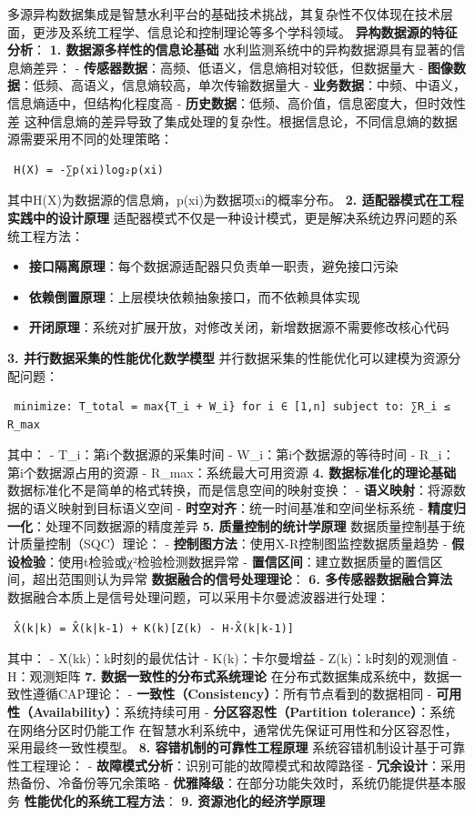 多源异构数据集成是智慧水利平台的基础技术挑战，其复杂性不仅体现在技术层面，更涉及系统工程学、信息论和控制理论等多个学科领域。 \textbf{异构数据源的特征分析}： \textbf{1. 数据源多样性的信息论基础} 水利监测系统中的异构数据源具有显著的信息熵差异： - \textbf{传感器数据}：高频、低语义，信息熵相对较低，但数据量大 - \textbf{图像数据}：低频、高语义，信息熵较高，单次传输数据量大 - \textbf{业务数据}：中频、中语义，信息熵适中，但结构化程度高 - \textbf{历史数据}：低频、高价值，信息密度大，但时效性差 这种信息熵的差异导致了集成处理的复杂性。根据信息论，不同信息熵的数据源需要采用不同的处理策略： \begin{verbatim} H(X) = -∑p(xi)log₂p(xi) \end{verbatim} 其中H(X)为数据源的信息熵，p(xi)为数据项xi的概率分布。 \textbf{2. 适配器模式在工程实践中的设计原理} 适配器模式不仅是一种设计模式，更是解决系统边界问题的系统工程方法： \begin{itemize} \item \textbf{接口隔离原理}：每个数据源适配器只负责单一职责，避免接口污染 \item \textbf{依赖倒置原理}：上层模块依赖抽象接口，而不依赖具体实现 \item \textbf{开闭原理}：系统对扩展开放，对修改关闭，新增数据源不需要修改核心代码 \end{itemize} \textbf{3. 并行数据采集的性能优化数学模型} 并行数据采集的性能优化可以建模为资源分配问题： \begin{verbatim} minimize: T_total = max{T_i + W_i} for i ∈ [1,n] subject to: ∑R_i ≤ R_max \end{verbatim} 其中： - T\_i：第i个数据源的采集时间 - W\_i：第i个数据源的等待时间 - R\_i：第i个数据源占用的资源 - R\_max：系统最大可用资源 \textbf{4. 数据标准化的理论基础} 数据标准化不是简单的格式转换，而是信息空间的映射变换： - \textbf{语义映射}：将源数据的语义映射到目标语义空间 - \textbf{时空对齐}：统一时间基准和空间坐标系统 - \textbf{精度归一化}：处理不同数据源的精度差异 \textbf{5. 质量控制的统计学原理} 数据质量控制基于统计质量控制（SQC）理论： - \textbf{控制图方法}：使用X-R控制图监控数据质量趋势 - \textbf{假设检验}：使用t检验或χ²检验检测数据异常 - \textbf{置信区间}：建立数据质量的置信区间，超出范围则认为异常 \textbf{数据融合的信号处理理论}： \textbf{6. 多传感器数据融合算法} 数据融合本质上是信号处理问题，可以采用卡尔曼滤波器进行处理： \begin{verbatim} X̂(k|k) = X̂(k|k-1) + K(k)[Z(k) - H·X̂(k|k-1)] \end{verbatim} 其中： - X̂(k\textbar k)：k时刻的最优估计 - K(k)：卡尔曼增益 - Z(k)：k时刻的观测值 - H：观测矩阵 \textbf{7. 数据一致性的分布式系统理论} 在分布式数据集成系统中，数据一致性遵循CAP理论： - \textbf{一致性（Consistency）}：所有节点看到的数据相同 - \textbf{可用性（Availability）}：系统持续可用 - \textbf{分区容忍性（Partition tolerance）}：系统在网络分区时仍能工作 在智慧水利系统中，通常优先保证可用性和分区容忍性，采用最终一致性模型。 \textbf{8. 容错机制的可靠性工程原理} 系统容错机制设计基于可靠性工程理论： - \textbf{故障模式分析}：识别可能的故障模式和故障路径 - \textbf{冗余设计}：采用热备份、冷备份等冗余策略 - \textbf{优雅降级}：在部分功能失效时，系统仍能提供基本服务 \textbf{性能优化的系统工程方法}： \textbf{9. 资源池化的经济学原理} 